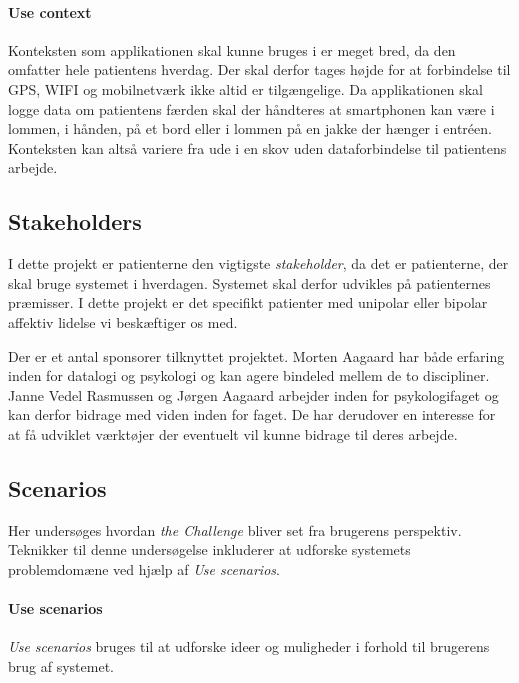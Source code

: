 \paragraph{Use context}
Konteksten som applikationen skal kunne bruges i er meget bred, da den omfatter hele patientens hverdag.
Der skal derfor tages højde for at forbindelse til GPS, WIFI og mobilnetværk ikke altid er tilgængelige.
Da applikationen skal logge data om patientens færden skal der håndteres at smartphonen kan være i lommen, i hånden, på et bord eller i lommen på en jakke der hænger i entréen.
Konteksten kan altså variere fra ude i en skov uden dataforbindelse til patientens arbejde.

\subsection{Stakeholders}
I dette projekt er patienterne den vigtigste \textit{stakeholder}, da det er patienterne, der skal bruge systemet i hverdagen.
Systemet skal derfor udvikles på patienternes præmisser.
I dette projekt er det specifikt patienter med unipolar eller bipolar affektiv lidelse vi beskæftiger os med.

Der er et antal sponsorer tilknyttet projektet.
Morten Aagaard har både erfaring inden for datalogi og psykologi og kan agere bindeled mellem de to discipliner.
Janne Vedel Rasmussen og Jørgen Aagaard arbejder inden for psykologifaget og kan derfor bidrage med viden inden for faget.
De har derudover en interesse for at få udviklet værktøjer der eventuelt vil kunne bidrage til deres arbejde.

\subsection{Scenarios}
Her undersøges hvordan \textit{the Challenge} bliver set fra brugerens perspektiv.
Teknikker til denne undersøgelse inkluderer at udforske systemets problemdomæne ved hjælp af \textit{Use scenarios}.

\paragraph{Use scenarios}
\textit{Use scenarios} bruges til at udforske ideer og muligheder i forhold til brugerens brug af systemet.

